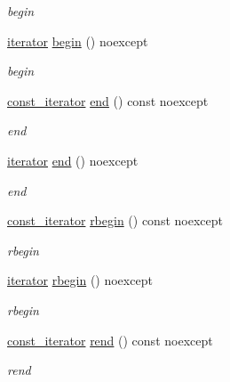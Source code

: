 \begin{DoxyCompactItemize}
\begin{DoxyCompactList}\small\item\em begin \end{DoxyCompactList}\item 
\hyperlink{classIceBRG_1_1element__accessor_a464911efedf30917f238c5fb4746cd09}{iterator} \hyperlink{classIceBRG_1_1element__accessor_a309a6182605449b81292ed2ff1cfb9df}{begin} () noexcept
\begin{DoxyCompactList}\small\item\em begin \end{DoxyCompactList}\item 
\hyperlink{classIceBRG_1_1element__accessor_ab9a6ca4866a0758171a4ffa7b0935cd2}{const\+\_\+iterator} \hyperlink{classIceBRG_1_1element__accessor_a9e095921326171995c319f3f44108472}{end} () const  noexcept
\begin{DoxyCompactList}\small\item\em end \end{DoxyCompactList}\item 
\hyperlink{classIceBRG_1_1element__accessor_a464911efedf30917f238c5fb4746cd09}{iterator} \hyperlink{classIceBRG_1_1element__accessor_a2d08fdb03734cb32bef953853be973fa}{end} () noexcept
\begin{DoxyCompactList}\small\item\em end \end{DoxyCompactList}\item 
\hyperlink{classIceBRG_1_1element__accessor_ab9a6ca4866a0758171a4ffa7b0935cd2}{const\+\_\+iterator} \hyperlink{classIceBRG_1_1element__accessor_a6911dfd28822d3c8e8008e7f79d455b7}{rbegin} () const  noexcept
\begin{DoxyCompactList}\small\item\em rbegin \end{DoxyCompactList}\item 
\hyperlink{classIceBRG_1_1element__accessor_a464911efedf30917f238c5fb4746cd09}{iterator} \hyperlink{classIceBRG_1_1element__accessor_ac16d8f00aa5b8f31f53b0a19c103dc9e}{rbegin} () noexcept
\begin{DoxyCompactList}\small\item\em rbegin \end{DoxyCompactList}\item 
\hyperlink{classIceBRG_1_1element__accessor_ab9a6ca4866a0758171a4ffa7b0935cd2}{const\+\_\+iterator} \hyperlink{classIceBRG_1_1element__accessor_a945ca43d1f99631647b1d4deb7499d72}{rend} () const  noexcept
\begin{DoxyCompactList}\small\item\em rend \end{DoxyCompactList}\item 

\end{DoxyCompactItemize}
